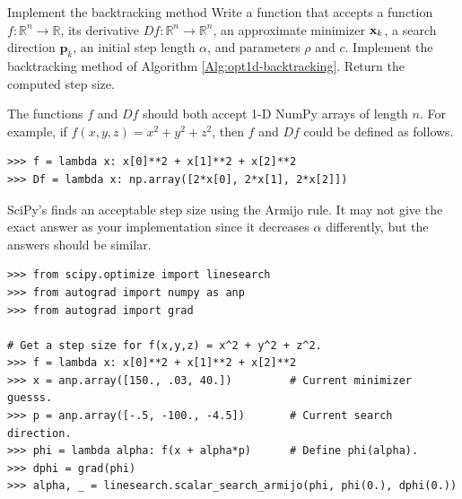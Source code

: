 \begin{problem}{Implement the backtracking method}{}
Write a function that accepts a function $f:\mathbb{R}^n\rightarrow\mathbb{R}$, its derivative $Df:\mathbb{R}^n\rightarrow\mathbb{R}^n$, an approximate minimizer $\mathbf{x}_k$, a search direction $\textbf{p}_k$, an initial step length $\alpha$, and parameters $\rho$ and $c$.
Implement the backtracking method of Algorithm \ref{Alg:opt1d-backtracking}.
Return the computed step size.

The functions $f$ and $Df$ should both accept 1-D NumPy arrays of length $n$.
For example, if $f(x,y,z) = x^2 + y^2 + z^2$, then $f$ and $Df$ could be defined as follows.
\begin{lstlisting}
>>> f = lambda x: x[0]**2 + x[1]**2 + x[2]**2
>>> Df = lambda x: np.array([2*x[0], 2*x[1], 2*x[2]])
\end{lstlisting}

SciPy's  finds an acceptable step size using the Armijo rule.
It may not give the exact answer as your implementation since it decreases $\alpha$ differently, but the answers should be similar.
\begin{lstlisting}
>>> from scipy.optimize import linesearch
>>> from autograd import numpy as anp
>>> from autograd import grad

# Get a step size for f(x,y,z) = x^2 + y^2 + z^2.
>>> f = lambda x: x[0]**2 + x[1]**2 + x[2]**2
>>> x = anp.array([150., .03, 40.])         # Current minimizer guesss.
>>> p = anp.array([-.5, -100., -4.5])       # Current search direction.
>>> phi = lambda alpha: f(x + alpha*p)      # Define phi(alpha).
>>> dphi = grad(phi)
>>> alpha, _ = linesearch.scalar_search_armijo(phi, phi(0.), dphi(0.))
\end{lstlisting}
\end{problem}

